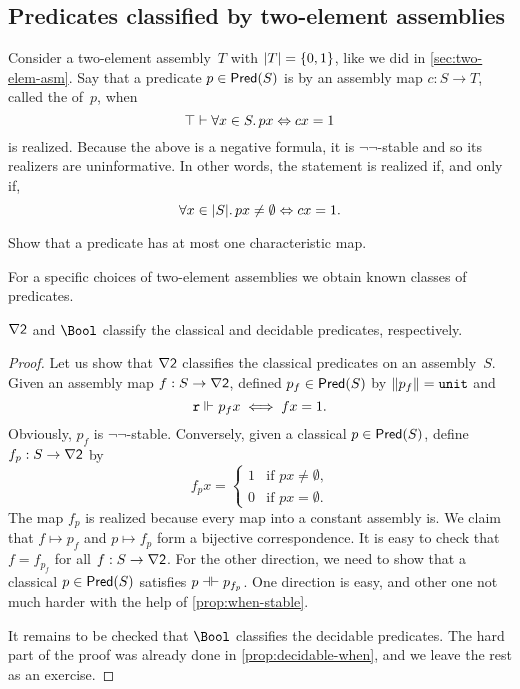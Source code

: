 \subsection{Predicates classified by two-element assemblies}
\label{sec:predicates-classified}

Consider a two-element assembly~$T$ with $|T| = \{0,1\}$, like we did in \cref{sec:two-elem-asm}. Say that a predicate $p \in \mathsf{Pred}(S)$ is  by an assembly map $c : S \to T$, called the  of~$p$, when
%
\begin{equation*}
  \top \vdash \forall x \in S .\, p x \Leftrightarrow c x = 1
\end{equation*}
%
is realized. Because the above is a negative formula, it is $\neg\neg$-stable and so its realizers are uninformative. In other words, the statement is realized if, and only if,
%
\begin{equation*}
  \forall x \in |S| .\, p x \neq \emptyset \Leftrightarrow c x = 1.
\end{equation*}

\begin{exercise}
  Show that a predicate has at most one characteristic map.
\end{exercise}

For a specific choices of two-element assemblies we obtain known classes of predicates.

\begin{proposition}
  $\nabla \mathsf{2}$ and $\Bool$ classify the classical and decidable predicates, respectively.
\end{proposition}

\begin{proof}
  Let us show that $\nabla \mathsf{2}$ classifies the classical predicates on an assembly~$S$.
  Given an assembly map $f : S \to \nabla \mathsf{2}$, defined $p_f \in \mathsf{Pred}(S)$ by $\|p_f\| = \mathtt{unit}$ and
  \begin{equation*}
    \mathtt{r} \Vdash_{} p_f x
    \iff
    f x = 1.
  \end{equation*}
  Obviously, $p_f$ is $\neg\neg$-stable. Conversely, given a classical $p \in \mathsf{Pred}(S)$, define $f_p : S \to \nabla \mathsf{2}$ by
  \begin{equation*}
    f_p x =
    \begin{cases}
      1 & \text{if $p x \neq \emptyset$,} \\
      0 & \text{if $p x = \emptyset$.}
    \end{cases}
  \end{equation*}
  The map $f_p$ is realized because every map into a constant assembly is.
  We claim that $f \mapsto p_f$ and $p \mapsto f_p$ form a bijective correspondence.
  It is easy to check that $f = f_{p_f}$ for all $f : S \to \nabla \mathsf{2}$.
  For the other direction, we need to show that a classical $p \in \mathsf{Pred}(S)$ satisfies $p \mathrel{{\dashv}{\vdash}} p_{f_p}$. One direction is easy, and other one not much harder with the help of \cref{prop:when-stable}.

  It remains to be checked that $\Bool$ classifies the decidable predicates.
  The hard part of the proof was already done in \cref{prop:decidable-when}, and we leave the rest as an exercise.
\end{proof}

